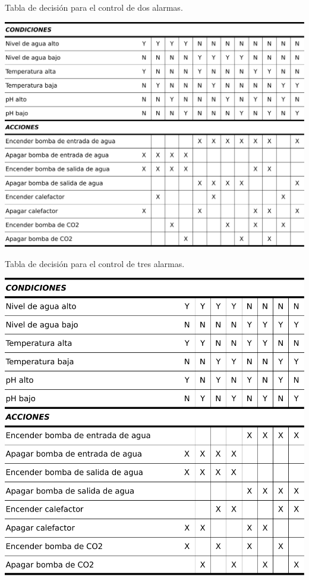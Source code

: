 \begin{table}[ht]
\centering
\caption{Tabla de decisión para el control de dos alarmas.}
\includegraphics[height=.4\textheight]{./Figures/tabla2alarmas.pdf}
\label{tab:2alarmas}
\end{table}

\vspace{5px}

\begin{table}[htp!]
	\centering
	\caption{Tabla de decisión para el control de tres alarmas.}
    \includegraphics[height=.4\textheight]{./Figures/tabla3alarmas.pdf}
	\label{tab:3alarmas}
\end{table}

